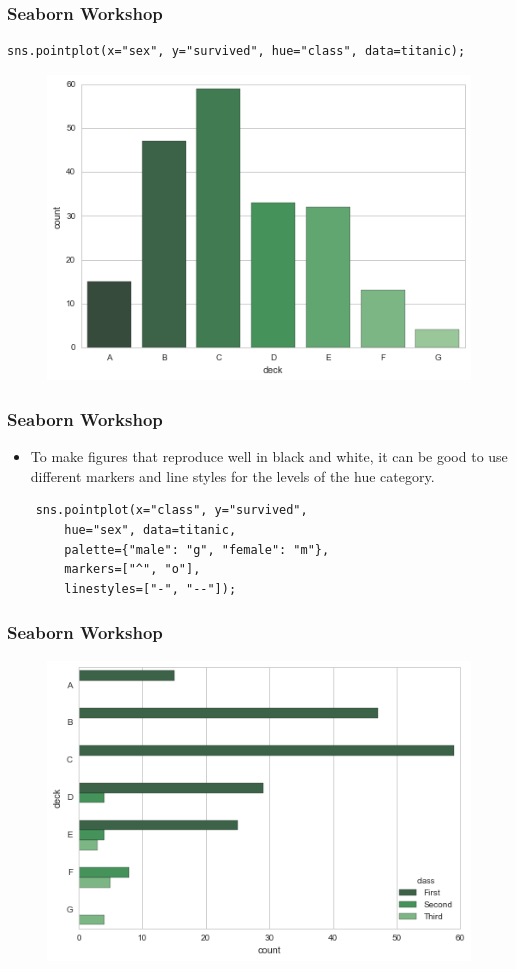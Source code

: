 \documentclass{beamer}
\begin{document}
\begin{frame}[fragile]
	\frametitle{Seaborn Workshop}
\large
\begin{verbatim}
sns.pointplot(x="sex", y="survived", hue="class", data=titanic);
\end{verbatim}
\begin{figure}
\centering
\includegraphics[width=0.7\linewidth]{images/categorical_35_0}
\end{figure}
\end{frame}
\begin{frame}[fragile]
	\frametitle{Seaborn Workshop}
	\large
\begin{itemize}
\item To make figures that reproduce well in black and white, it can be good to use different markers and line styles for the levels of the hue category.
\end{itemize}
\begin{framed}
	\begin{verbatim}
	sns.pointplot(x="class", y="survived", 
	    hue="sex", data=titanic,
	    palette={"male": "g", "female": "m"},
	    markers=["^", "o"], 
	    linestyles=["-", "--"]);
	\end{verbatim}
\end{framed}
\end{frame}
\begin{frame}[fragile]
	\frametitle{Seaborn Workshop}
	\large

\begin{figure}
\centering
\includegraphics[width=0.9\linewidth]{images/categorical_37_0}
\end{figure}

\end{frame}
\end{document}
